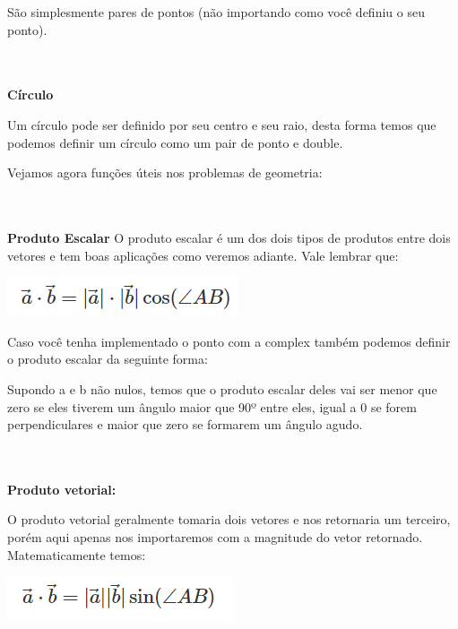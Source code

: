 \documentclass[a4paper,12pt]{article}
\begin{document}
\noindent São simplesmente pares de pontos (não importando como você definiu o seu ponto).

\\~\\\noindent\textbf{Círculo}

\noindent Um círculo pode ser definido por seu centro e seu raio, desta forma temos que podemos definir um círculo como um pair de ponto e double.

\noindent Vejamos agora funções úteis nos problemas de geometria:

\\~\\\noindent\textbf{Produto Escalar}
\noindent O produto escalar é um dos dois tipos de produtos entre dois vetores e tem boas aplicações como veremos adiante. Vale lembrar que:

\begin{center}
  \includegraphics[width=\linewidth/4]{figures/matematica_computacional/geometria_computacional_basica/produto_escalar.png}
\end{center}


\noindent Caso você tenha implementado o ponto com a complex também podemos definir o produto escalar da seguinte forma:


\noindent Supondo a e b não nulos, temos que o produto escalar deles vai ser menor que zero se eles tiverem um ângulo maior que 90º entre eles, igual a 0 se forem perpendiculares e maior que zero se formarem um ângulo agudo.

\\~\\\noindent\textbf{Produto vetorial:}

\noindent O produto vetorial geralmente tomaria dois vetores e nos retornaria um terceiro, porém aqui apenas nos importaremos com a magnitude do vetor retornado. Matematicamente temos:

\begin{center}
  \includegraphics[width=\linewidth/4]{figures/matematica_computacional/geometria_computacional_basica/produto_vetorial.png}
\end{center}
\end{document}
